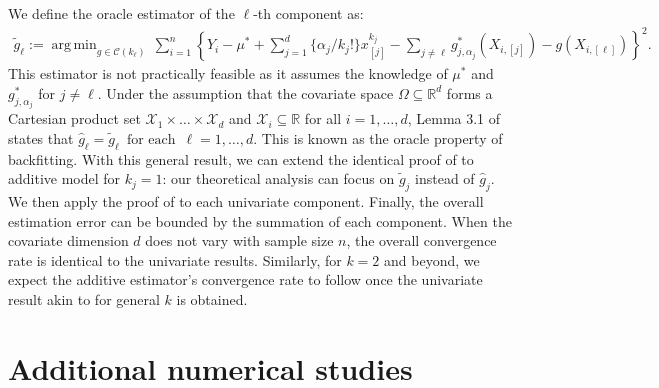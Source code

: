\documentclass[12pt]{article}
\DeclareMathOperator*{\argmin}{arg\,min}
\begin{document}
\begin{appendices}
We define the oracle estimator of the $\ell$-th component as:
\begin{align*}
    \widetilde g_{\ell} := \argmin_{g\in\mathcal{C}(k_\ell)}\,\sum_{i=1}^n\left\{Y_i-\mu^*+\sum_{j =1}^d\{\alpha_j/k_j!\} x_{[j]}^{k_j}-\sum_{j \neq \ell} g^*_{j, \alpha_j}(X_{i,[j]})- g(X_{i,[\ell]})\right\}^2.
\end{align*}
This estimator is not practically feasible as it assumes the knowledge of $\mu^*$ and $g^*_{j, \alpha_j}$ for $j \neq \ell$.  Under the assumption that the covariate space $\Omega \subseteq \mathbb{R}^d$ forms a Cartesian product set $\mathcal{X}_1 \times \ldots \times \mathcal{X}_d$ and $\mathcal{X}_i \subseteq \mathbb{R}$ for all $i=1,\ldots,d$, Lemma 3.1 of \cite{guntuboyina2018nonparametric} states that $\widehat g_\ell = \widetilde g_\ell\, \text{ for each } \,\ell=1,\ldots, d.$ This is known as the oracle property of backfitting. With this general result, we can extend the identical proof of  to additive model for $k_j=1$: our theoretical analysis can focus on $\widetilde g_{j}$ instead of $\widehat g_j$.
We then apply the proof of  to each univariate component. Finally, the overall estimation error can be bounded by the summation of each component. When the covariate dimension $d$ does not vary with sample size $n$, the overall convergence rate is identical to the univariate results.
Similarly, for $k = 2$ and beyond, we expect the additive estimator's convergence rate to follow once the univariate result akin to  for general $k$ is obtained.

\newpage
\section{Additional numerical studies}\label{supp:simulation}

\end{appendices}
\end{document}
